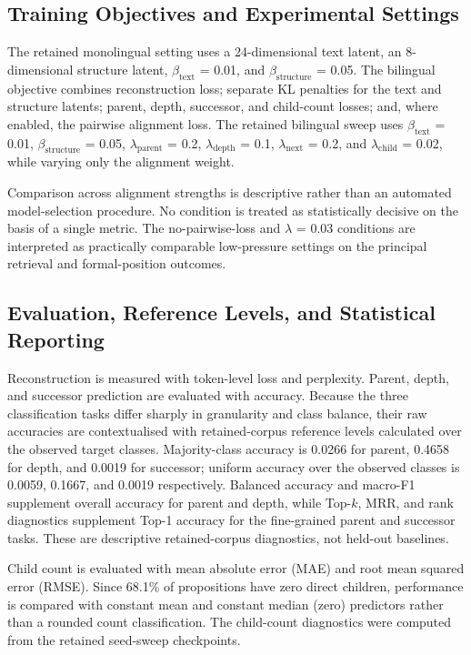 \documentclass[webpdf,modern,medium,namedate]{oup-authoring-template}
\begin{document}
\subsection{Training Objectives and Experimental Settings}
The retained monolingual setting uses a 24-dimensional text latent, an 8-dimensional structure latent, $\beta_{\mathrm{text}}$ = 0.01, and $\beta_{\mathrm{structure}}$ = 0.05. The bilingual objective combines reconstruction loss; separate KL penalties for the text and structure latents; parent, depth, successor, and child-count losses; and, where enabled, the pairwise alignment loss. The retained bilingual sweep uses $\beta_{\mathrm{text}}$ = 0.01, $\beta_{\mathrm{structure}}$ = 0.05, $\lambda_{\mathrm{parent}}$ = 0.2, $\lambda_{\mathrm{depth}}$ = 0.1, $\lambda_{\mathrm{next}}$ = 0.2, and $\lambda_{\mathrm{child}}$ = 0.02, while varying only the alignment weight.

Comparison across alignment strengths is descriptive rather than an automated model-selection procedure. No condition is treated as statistically decisive on the basis of a single metric. The no-pairwise-loss and $\lambda$ = 0.03 conditions are interpreted as practically comparable low-pressure settings on the principal retrieval and formal-position outcomes.

\subsection{Evaluation, Reference Levels, and Statistical Reporting}
Reconstruction is measured with token-level loss and perplexity. Parent, depth, and successor prediction are evaluated with accuracy. Because the three classification tasks differ sharply in granularity and class balance, their raw accuracies are contextualised with retained-corpus reference levels calculated over the observed target classes. Majority-class accuracy is 0.0266 for parent, 0.4658 for depth, and 0.0019 for successor; uniform accuracy over the observed classes is 0.0059, 0.1667, and 0.0019 respectively. Balanced accuracy and macro-F1 supplement overall accuracy for parent and depth, while Top-$k$, MRR, and rank diagnostics supplement Top-1 accuracy for the fine-grained parent and successor tasks. These are descriptive retained-corpus diagnostics, not held-out baselines.

Child count is evaluated with mean absolute error (MAE) and root mean squared error (RMSE). Since 68.1\% of propositions have zero direct children, performance is compared with constant mean and constant median (zero) predictors rather than a rounded count classification. The child-count diagnostics were computed from the retained seed-sweep checkpoints.
\end{document}
